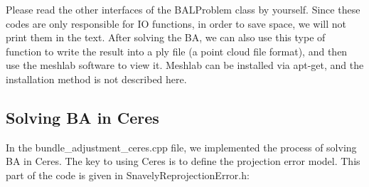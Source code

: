 Please read the other interfaces of the BALProblem class by yourself. Since these codes are only responsible for IO functions, in order to save space, we will not print them in the text. After solving the BA, we can also use this type of function to write the result into a ply file (a point cloud file format), and then use the meshlab software to view it. Meshlab can be installed via apt-get, and the installation method is not described here.

\subsection{Solving BA in Ceres}
In the bundle\_adjustment\_ceres.cpp file, we implemented the process of solving BA in Ceres. The key to using Ceres is to define the projection error model. This part of the code is given in SnavelyReprojectionError.h:

